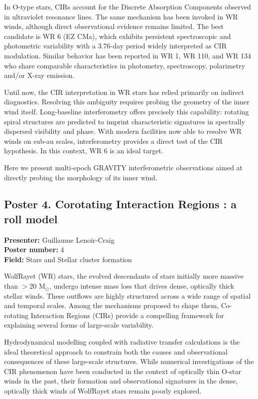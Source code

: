 In O-type stars, CIRs account for the Discrete Absorption Components observed in ultraviolet resonance lines. The same mechanism has been invoked in WR winds, although direct observational evidence remains limited. The best candidate is WR 6 (EZ CMa), which exhibits persistent spectroscopic and photometric variability with a 3.76-day period widely interpreted as CIR modulation. Similar behavior has been reported in WR 1, WR 110, and WR 134 who share comparable characteristics in photometry, spectroscopy, polarimetry and/or X-ray emission.

Until now, the CIR interpretation in WR stars has relied primarily on indirect diagnostics. Resolving this ambiguity requires probing the geometry of the inner wind itself. Long-baseline interferometry offers precisely this capability: rotating spiral structures are predicted to imprint characteristic signatures in spectrally dispersed visibility and phase. With modern facilities now able to resolve WR winds on sub-au scales, interferometry provides a direct test of the CIR hypothesis. In this context, WR 6 is an ideal target.

Here we present multi-epoch GRAVITY interferometric observations aimed at directly probing the morphology of its inner wind.

\hypertarget{poster-abstract-talk-308}{}\label{poster-abstract-page-talk-308}
\subsection*{Poster 4. Corotating Interaction Regions : a roll model}
\textbf{Presenter:} Guillaume Lenoir-Craig\\
\textbf{Poster number:} 4\\
\textbf{Field:} Stars and Stellar cluster formation

WolfRayet (WR) stars, the evolved descendants of stars initially more massive than $>$20 M$_\odot$, undergo intense mass loss that drives dense, optically thick stellar winds. These outflows are highly structured across a wide range of spatial and temporal scales. Among the mechanisms proposed to shape them, Co-rotating Interaction Regions (CIRs) provide a compelling framework for explaining several forms of large-scale variability.

Hydrodynamical modelling coupled with radiative transfer calculations is the ideal theoretical approach to constrain both the causes and observational consequences of these large-scale structures. While numerical investigations of the CIR phenomenon have been conducted in the context of optically thin O-star winds in the past, their formation and observational signatures in the dense, optically thick winds of WolfRayet stars remain poorly explored.

